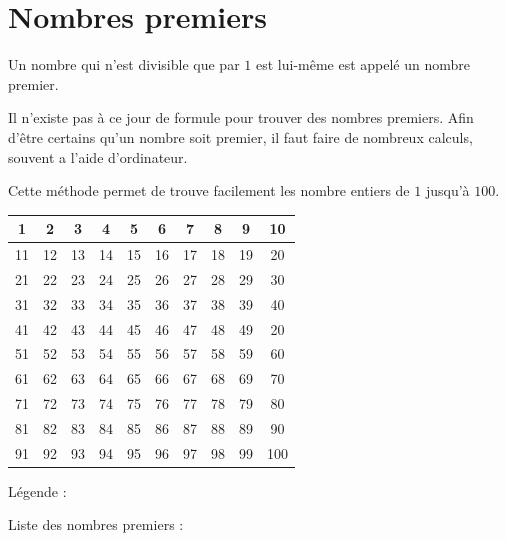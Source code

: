 \documentclass[a4paper,10pt]{report}
\begin{document}
\vspace{-2mm}
\section{Nombres premiers}

\vspace{-2mm}
\begin{defn}
Un nombre qui n'est divisible que par $1$ est lui-même est appelé un nombre premier.
\end{defn}

\begin{rem}
Il n'existe pas à ce jour de formule pour trouver des nombres premiers. Afin d'être certains qu'un nombre soit premier, il faut faire de nombreux calculs, souvent a l'aide d'ordinateur.
\end{rem}

\begin{ex}

Cette méthode permet de trouve facilement les nombre entiers de $1$ jusqu'à $100$.

\medskip
\begin{minipage}{9cm}
\renewcommand{\arraystretch}{1.5}
\begin{tabular}{|c|c|c|c|c|c|c|c|c|c|}
\hline
1&2&3&4&5&6&7&8&9&10 \\\hline
11&12&13&14&15&16&17&18&19&20 \\\hline
21&22&23&24&25&26&27&28&29&30 \\\hline
31&32&33&34&35&36&37&38&39&40 \\\hline
41&42&43&44&45&46&47&48&49&20 \\\hline
51&52&53&54&55&56&57&58&59&60 \\\hline
61&62&63&64&65&66&67&68&69&70 \\\hline
71&72&73&74&75&76&77&78&79&80 \\\hline
81&82&83&84&85&86&87&88&89&90 \\\hline
91&92&93&94&95&96&97&98&99&100 \\\hline
\end{tabular}
\end{minipage}
\begin{minipage}{7.2cm}
Légende :

\medskip
\noindent\grandscarreaux{\linewidth}{4cm}

\medskip
Liste des nombres premiers :

\medskip
\noindent\grandscarreaux{\linewidth}{0.8cm}
\end{minipage}
\end{ex}
\end{document}
